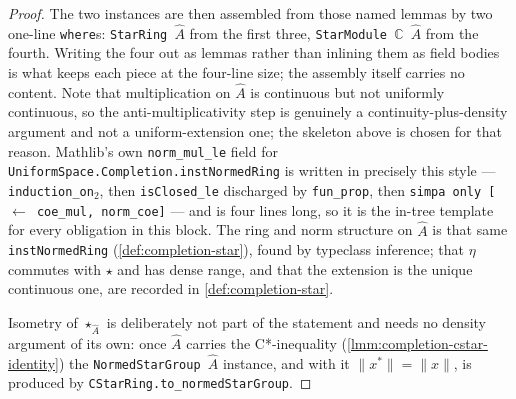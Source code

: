 \begin{proof}
    The two instances are then assembled from those named lemmas by two one-line \texttt{where}s: \texttt{StarRing \ensuremath{\widehat{A}}} from the first three, \texttt{StarModule \ensuremath{\mathbb{C}} \ensuremath{\widehat{A}}} from the fourth. Writing the four out as lemmas rather than inlining them as field bodies is what keeps each piece at the four-line size; the assembly itself carries no content. Note that multiplication on $\widehat{A}$ is continuous but not uniformly continuous, so the anti-multiplicativity step is genuinely a continuity-plus-density argument and not a uniform-extension one; the skeleton above is chosen for that reason. Mathlib's own \texttt{norm\_mul\_le} field for \texttt{UniformSpace.Completion.instNormedRing} is written in precisely this style --- \texttt{induction\_on\ensuremath{{}_2}}, then \texttt{isClosed\_le} discharged by \texttt{fun\_prop}, then \texttt{simpa only [\ensuremath{\leftarrow} coe\_mul, norm\_coe]} --- and is four lines long, so it is the in-tree template for every obligation in this block. The ring and norm structure on $\widehat{A}$ is that same \texttt{instNormedRing} (\ref{def:completion-star}), found by typeclass inference; that $\eta$ commutes with $\star$ and has dense range, and that the extension is the unique continuous one, are recorded in \ref{def:completion-star}.

    Isometry of $\star_{\widehat{A}}$ is deliberately not part of the statement and needs no density argument of its own: once $\widehat{A}$ carries the C*-inequality (\ref{lmm:completion-cstar-identity}) the \texttt{NormedStarGroup \ensuremath{\widehat{A}}} instance, and with it $\|x^{*}\| = \|x\|$, is produced by \texttt{CStarRing.to\_normedStarGroup}.
\end{proof}

